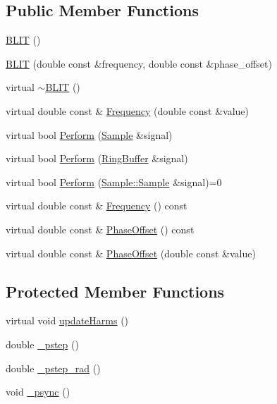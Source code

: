 \subsection*{Public Member Functions}
\begin{DoxyCompactItemize}
\item 
\hyperlink{classDSG_1_1BLIT_adce48aa8a4f30706a339361a565b1b75}{B\+L\+I\+T} ()
\item 
\hyperlink{classDSG_1_1BLIT_a2155ccee2dc729bf6210c543190dbe35}{B\+L\+I\+T} (double const \&frequency, double const \&phase\+\_\+offset)
\item 
virtual \hyperlink{classDSG_1_1BLIT_a69b280e6c5fd20d0d294dde1c496db63}{$\sim$\+B\+L\+I\+T} ()
\item 
virtual double const \& \hyperlink{classDSG_1_1BLIT_a67b698a54f37c361945cae3e137af76f}{Frequency} (double const \&value)
\item 
virtual bool \hyperlink{classDSG_1_1BLIT_a0f769ac63ee884a6d3899b38d6c2944c}{Perform} (\hyperlink{classDSG_1_1Sample}{Sample} \&signal)
\item 
virtual bool \hyperlink{classDSG_1_1BLIT_ae464457074d366c46f42b53b59d82ecb}{Perform} (\hyperlink{classDSG_1_1RingBuffer}{Ring\+Buffer} \&signal)
\item 
virtual bool \hyperlink{classDSG_1_1SignalProcess_afdb8220100418893950c1161dd24db67}{Perform} (\hyperlink{classDSG_1_1Sample_aaf2e30d73911eccea99b53eeee15b612}{Sample\+::\+Sample} \&signal)=0
\item 
virtual double const \& \hyperlink{classDSG_1_1SignalGenerator_aedac746c5a70818d120858542ecb7c45}{Frequency} () const 
\item 
virtual double const \& \hyperlink{classDSG_1_1SignalGenerator_a1ce521847edd0b837fd840998f906b4b}{Phase\+Offset} () const 
\item 
virtual double const \& \hyperlink{classDSG_1_1SignalGenerator_a08b71b1f30ba65e629642c570291dc0e}{Phase\+Offset} (double const \&value)
\end{DoxyCompactItemize}
\subsection*{Protected Member Functions}
\begin{DoxyCompactItemize}
\item 
virtual void \hyperlink{classDSG_1_1BLIT_ac59980dee201683229d5a106f941298b}{update\+Harms} ()
\item 
double \hyperlink{classDSG_1_1SignalGenerator_ac0d781b8673b3a283bf7c133290ede50}{\+\_\+pstep} ()
\item 
double \hyperlink{classDSG_1_1SignalGenerator_ae660eb4caa88b8d278f8d24d0908a487}{\+\_\+pstep\+\_\+rad} ()
\item 
void \hyperlink{classDSG_1_1SignalGenerator_a05baccb38d1e52860d4fcf7cb8430efc}{\+\_\+psync} ()
\end{DoxyCompactItemize}
